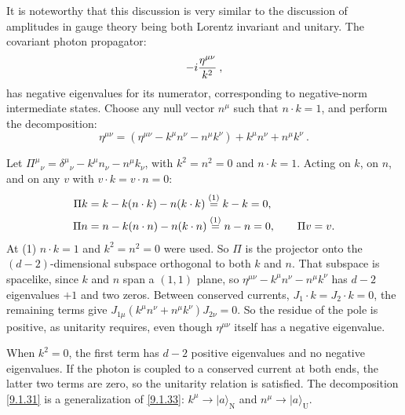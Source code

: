 It is noteworthy that this discussion is very similar to the discussion of amplitudes in gauge theory being both Lorentz invariant and unitary. The covariant photon propagator:
\begin{equation}
	-i \frac{\eta^{\mu \nu}}{k^{2}} \:, \label{9.1.32}
\end{equation}
has negative eigenvalues for its numerator, corresponding to negative-norm intermediate states.
Choose any null vector $n^{\mu}$ such that $n \cdot k=1$, and perform the decomposition:
\begin{equation}
	\eta^{\mu \nu}=(\eta^{\mu \nu}-k^{\mu} n^{\nu}-n^{\mu} k^{\nu}) + k^{\mu} n^{\nu}+n^{\mu} k^{\nu} \:. \label{9.1.33}
\end{equation}
\begin{tcolorbox}[breakable]
	\begin{remark}
		Let $\Pi^\mu{}_\nu=\delta^\mu{}_\nu-k^\mu n_\nu-n^\mu k_\nu$, with $k^2=n^2=0$ and $n\cdot k=1$. Acting on $k$, on $n$, and on any $v$ with $v\cdot k=v\cdot n=0$:
		\begin{align*}
			\Pi k&=k-k(n\cdot k)-n(k\cdot k)\overset{(1)}{=}k-k=0,\\
			\Pi n&=n-k(n\cdot n)-n(k\cdot n)\overset{(1)}{=}n-n=0,\qquad
			\Pi v=v .
		\end{align*}
		At (1) $n\cdot k=1$ and $k^2=n^2=0$ were used. So $\Pi$ is the projector onto the $(d-2)$-dimensional subspace orthogonal to both $k$ and $n$. That subspace is spacelike, since $k$ and $n$ span a $(1,1)$ plane, so $\eta^{\mu\nu}-k^\mu n^\nu-n^\mu k^\nu$ has $d-2$ eigenvalues $+1$ and two zeros. Between conserved currents, $J_1\cdot k=J_2\cdot k=0$, the remaining terms give $J_{1\mu}(k^\mu n^\nu+n^\mu k^\nu)J_{2\nu}=0$. So the residue of the pole is positive, as unitarity requires, even though $\eta^{\mu\nu}$ itself has a negative eigenvalue.
	\end{remark}
\end{tcolorbox}
When $k^{2}=0$, the first term has $d-2$ positive eigenvalues and no negative eigenvalues.
If the photon is coupled to a conserved current at both ends, the latter two terms are zero, so the unitarity relation is satisfied. 
The decomposition \eqref{9.1.31} is a generalization of \eqref{9.1.33}: $k^{\mu} \rightarrow|a\rangle_{\mathrm{N}}$ and $n^{\mu} \rightarrow|a\rangle_{\mathrm{U}}$.

